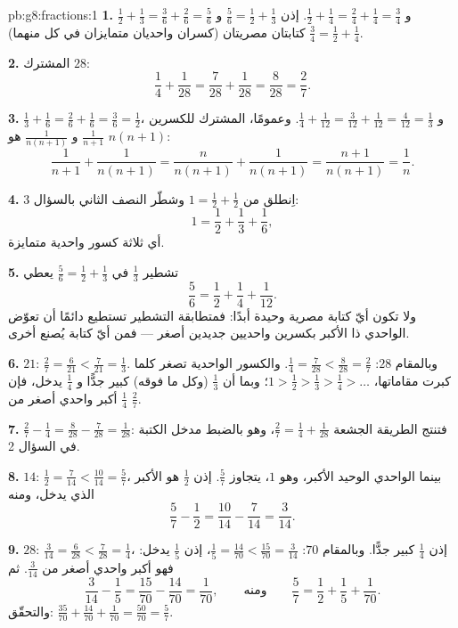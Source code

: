 \begin{solution}{pb:g8:fractions:1}
\textbf{1.} $\frac12 + \frac13 = \frac36 + \frac26 = \frac56$ و
$\frac12 + \frac14 = \frac24 + \frac14 = \frac34$. إذن
$\frac56 = \frac12 + \frac13$ و $\frac34 = \frac12 + \frac14$
كتابتان مصريتان (كسران واحديان متمايزان في كل منهما).

\textbf{2.}  المشترك $28$:
\[
\frac14 + \frac{1}{28} = \frac{7}{28} + \frac{1}{28}
= \frac{8}{28} = \frac{2}{7} .
\]

\textbf{3.} $\frac13 + \frac16 = \frac26 + \frac16 = \frac36 =
\frac12$، و $\frac14 + \frac{1}{12} = \frac{3}{12} +
\frac{1}{12} = \frac{4}{12} = \frac13$. وعمومًا، 
المشترك للكسرين $\frac{1}{n+1}$ و $\frac{1}{n(n+1)}$ هو
$n(n+1)$:
\[
\frac{1}{n+1} + \frac{1}{n(n+1)}
= \frac{n}{n(n+1)} + \frac{1}{n(n+1)}
= \frac{n+1}{n(n+1)}
= \frac{1}{n} .
\]

\textbf{4.} اِنطلق من $1 = \frac12 + \frac12$ وشطّر النصف
الثاني بالسؤال 3:
\[
1 = \frac12 + \frac13 + \frac16 ,
\]
أي ثلاثة كسور واحدية متمايزة.

\textbf{5.} تشطير $\frac13$ في $\frac56 = \frac12 +
\frac13$ يعطي
\[
\frac56 = \frac12 + \frac14 + \frac{1}{12} .
\]
ولا تكون أيّ كتابة مصرية وحيدة أبدًا: فمتطابقة التشطير تستطيع
دائمًا أن تعوّض  الواحدي ذا  الأكبر
بكسرين واحديين جديدين أصغر --- فمن أيّ كتابة
يُصنع أخرى.

\textbf{6.}  $21$: $\frac27 = \frac{6}{21} <
\frac{7}{21} = \frac13$. وبالمقام $28$: $\frac14 =
\frac{7}{28} < \frac{8}{28} = \frac27$. والكسور الواحدية تصغر كلما
كبرت مقاماتها، $1 > \frac12 > \frac13 > \frac14 >
\dots$؛ وبما أن $\frac13$ (وكل ما فوقه) كبير جدًّا و
$\frac14$ يدخل، فإن $\frac14$ أكبر  واحدي أصغر
من $\frac27$.

\textbf{7.} $\frac27 - \frac14 = \frac{8}{28} - \frac{7}{28} =
\frac{1}{28}$: فتنتج الطريقة الجشعة
$\frac27 = \frac14 + \frac{1}{28}$، وهو بالضبط مدخل الكتبة في
السؤال 2.

\textbf{8.}  $14$: $\frac12 = \frac{7}{14} <
\frac{10}{14} = \frac57$، بينما  الواحدي الوحيد الأكبر،
وهو $1$، يتجاوز $\frac57$. إذن $\frac12$ هو الأكبر الذي يدخل،
ومنه
\[
\frac57 - \frac12 = \frac{10}{14} - \frac{7}{14} = \frac{3}{14} .
\]

\textbf{9.}  $28$: $\frac{3}{14} = \frac{6}{28} <
\frac{7}{28} = \frac14$، إذن $\frac14$ كبير جدًّا. وبالمقام
$70$: $\frac15 = \frac{14}{70} < \frac{15}{70} =
\frac{3}{14}$، إذن $\frac15$ يدخل: فهو أكبر  واحدي
أصغر من $\frac{3}{14}$. ثم
\[
\frac{3}{14} - \frac15 = \frac{15}{70} - \frac{14}{70}
= \frac{1}{70},
\qquad\text{ومنه}\qquad
\frac57 = \frac12 + \frac15 + \frac{1}{70} .
\]
والتحقّق: $\frac{35}{70} + \frac{14}{70} + \frac{1}{70} =
\frac{50}{70} = \frac57$.


\end{solution}
